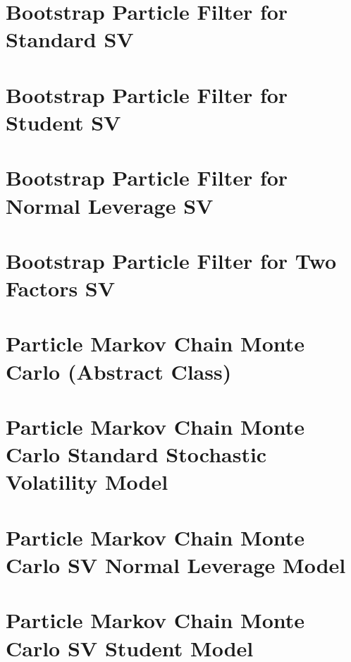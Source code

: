 \documentclass[11pt,a4,twosided,singlespacing,titlepagenumber=on]{scrreprt}
\numberwithin{equation}{chapter} %
\theoremstyle{remark}
\begin{document}
\section{Bootstrap Particle Filter for Standard SV}


\section{Bootstrap Particle Filter for Student SV}


\section{Bootstrap Particle Filter for Normal Leverage SV}


\section{Bootstrap Particle Filter for Two Factors SV}


\section{Particle Markov Chain Monte Carlo (Abstract Class)}


\section{Particle Markov Chain Monte Carlo Standard Stochastic Volatility Model}


\section{Particle Markov Chain Monte Carlo SV Normal Leverage Model}


\section{Particle Markov Chain Monte Carlo SV Student Model}

\end{document}
